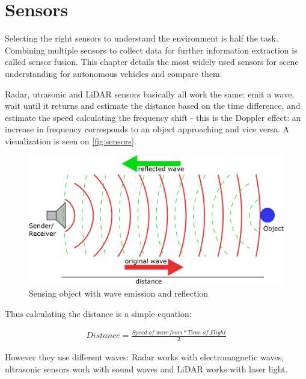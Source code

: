 \chapter{Sensors}
\label{chap:sensors}

Selecting the right sensors to understand the environment is half the task.
Combining multiple sensors to collect data for further information extraction is
called sensor fusion. This chapter details the most widely used sensors for
scene understanding for autonomous vehicles and compare them. 

Radar, utrasonic and LiDAR sensors basically all work the same: emit a wave,
wait until it returns and estimate the distance based on the time difference,
and estimate the speed calculating the frequency shift - this is the Doppler
effect: an increase in frequency corresponds to an object approaching and vice
versa. A visualization is seen on \autoref{fig:sensors}.

\begin{figure}[!ht]
    \centering
    \includegraphics[width=150mm, keepaspectratio]{figures/sensors.png}
    \caption{Sensing object with wave emission and reflection}
    \label{fig:sensors}
\end{figure}

Thus calculating the distance is a simple equation:

\begin{align}
    Distance=\frac{Speed\; of\; wavefrom * Time\; of\; Flight}{2}
\end{align}

However they use different waves: Radar works with electromagnetic waves,
ultrasonic sensors work with sound waves and LiDAR works with laser light.

